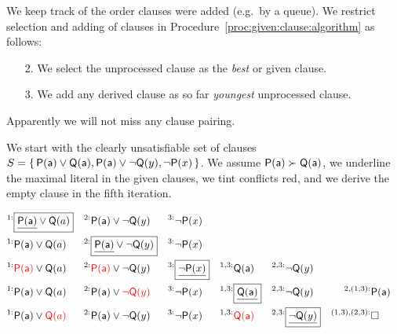 \begin{definition}
	We keep track of the order clauses were added (e.g.\ by a queue).
	We restrict selection and adding of clauses
	in Procedure~\ref{proc:given:clause:algorithm} as follows:
	\begin{enumerate}
		\item[2.]
		We select the  unprocessed clause as the \emph{best} or given clause.
		\item[3.]
		We add any derived clause
		as so far \emph{youngest} unprocessed clause.
	\end{enumerate}
	Apparently we will not miss any clause pairing.
\end{definition}



\begin{example}
	We start with the clearly unsatisfiable set of clauses
\( S=\{ \, \mathsf{P}(\mathsf{a})\lor\mathsf{Q}(\mathsf{a}), \mathsf{P}(\mathsf{a})\lor\lnot\mathsf{Q}(y), \lnot\mathsf{P}(x) \, \} \).
	We assume \( \mathsf{P}(\mathsf{a})\succ\mathsf{Q}(\mathsf{a}) \),
	we underline the maximal literal in the given clauses,
	we tint conflicts red,
	 and we derive the empty clause in the fifth iteration.

	\begin{align*}
	^{1:}&\boxed{\underline{\mP(\ma)}\lor\mQ(a)}
	& ^{2:}&\mP(\ma)\lor\lnot\mQ(y) & ^{3:}&\lnot\mP(x)
	\\
	^{1:}&\mP(\ma)\lor\mQ(a)
	& ^{2:}&\boxed{\underline{\mP(\ma)}\lor\lnot\mQ(y)} & ^{3:}&\lnot\mP(x)
	\\
	^{1:}&{\colLo\mP(\ma)}\lor\mQ(a)
	& ^{2:}&{\colLo\mP(\ma)}\lor\lnot\mQ(y)
	& ^{3:}&\boxed{\underline{\lnot\mP(x)}}
	& ^{1,3:}&\mQ(\ma)
	& ^{2,3:}&\lnot\mQ(y)
	\\
	^{1:}&\mP(\ma)\lor\mQ(a)
	& ^{2:}&\mP(\ma)\lor{\colLo\lnot\mQ(y)}
	& ^{3:}&\lnot\mP(x)
	& ^{1,3:}&\boxed{\underline{\mQ(\ma)}}
	& ^{2,3:}&\lnot\mQ(y)
	& ^{2,(1,3):}&\mP(\ma)
	\\
	^{1:}&\mP(\ma)\lor{\colLo\mQ(a)}
	& ^{2:}&\mP(\ma)\lor\lnot\mQ(y)
	& ^{3:}&\lnot\mP(x)
	& ^{1,3:}&\colLo\mQ(\ma)
	& ^{2,3:}&\boxed{\underline{\lnot\mQ(y)}}
	& ^{(1,3),(2,3):}&\emptyclause
	\end{align*}
\end{example}


